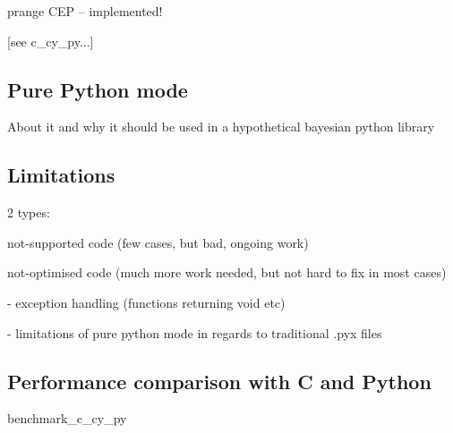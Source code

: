 prange CEP -- implemented!

[see c\_cy\_py...]

\subsection{Pure Python mode}

About it and why it should be used in a hypothetical bayesian python library

\subsection{Limitations}

2 types:

	not-supported code (few cases, but bad, ongoing work)

	not-optimised code (much more work needed, but not hard to fix in most cases)

		- exception handling (functions returning void etc)

		- limitations of pure python mode in regards to traditional .pyx files

\subsection{Performance comparison with C and Python} \label{sec:CythonPerformace}

benchmark\_c\_cy\_py

